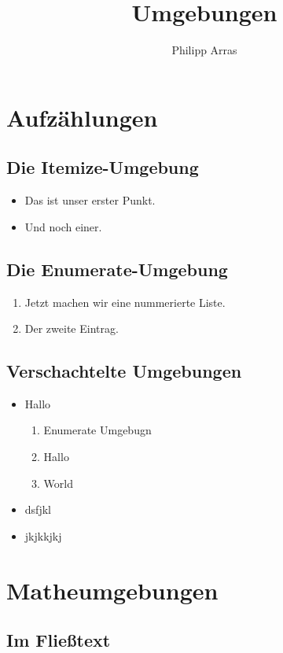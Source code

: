 \documentclass[a4paper,ngerman]{scrartcl} %
\author{Philipp Arras}
\title{Umgebungen}
\begin{document}
\maketitle

\section{Aufzählungen}

\subsection{Die Itemize-Umgebung}

\blindtext
\begin{itemize}
\item Das ist unser erster Punkt.
\item Und noch einer.
\end{itemize}
\blindtext


\subsection{Die Enumerate-Umgebung}
\blindtext
\begin{enumerate}
\item Jetzt machen wir eine nummerierte Liste.
\item Der zweite Eintrag.
\end{enumerate}
\blindtext

\subsection{Verschachtelte Umgebungen}

\begin{itemize}
\item Hallo
	\begin{enumerate}
	\item Enumerate Umgebugn
	\item Hallo
	\item World
	\end{enumerate}
\item dsfjkl
\item jkjkkjkj
\end{itemize}


\section{Matheumgebungen}

\subsection{Im Fließtext}
\end{document}
